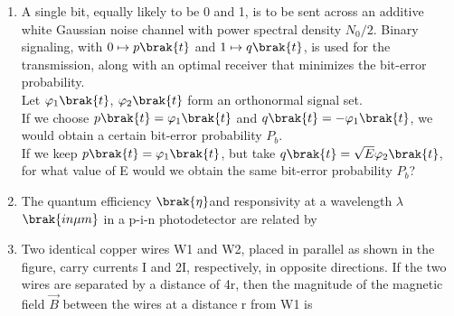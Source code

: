 \documentclass[a4paper, 11pt]{article}
\begin{document}
\begin{enumerate}
    \item A single bit, equally likely to be 0 and 1, is to be sent across an additive white Gaussian noise  channel with power spectral density $N_{0}/2$. Binary signaling, with $0\mapsto p\brak{t}$ and $1\mapsto q\brak{t}$, is used for the transmission, along with an optimal receiver that minimizes the bit-error probability.\\Let $\varphi_{1}\brak{t}$, $\varphi_{2}\brak{t}$ form an orthonormal signal set.\\If we choose $p\brak{t}=\varphi_{1}\brak{t}$ and $q\brak{t}=-\varphi_{1}\brak{t}$, we would obtain a certain bit-error probability $P_{b}$.\\If we keep $p\brak{t}=\varphi_{1}\brak{t}$, but take $q\brak{t}=\sqrt{E}\varphi_{2}\brak{t}$, for what value of E would we obtain the same bit-error probability $P_{b}$?
    \begin{enumerate}
    \end{enumerate}
    
    \hfill{}
    
    \item The quantum efficiency $\brak{\eta}$and responsivity  at a wavelength $\lambda$ $\brak{in \mu m}$ in a p-i-n photodetector are related by
    \begin{enumerate}
    \end{enumerate}
    
    \hfill{}
    
    \item Two identical copper wires W1 and W2, placed in parallel as shown in the figure, carry currents I and 2I, respectively, in opposite directions. If the two wires are separated by a distance of 4r, then the magnitude of the magnetic field $\vec{B}$ between the wires at a distance r from W1 is
    

\end{enumerate}
\end{document}
